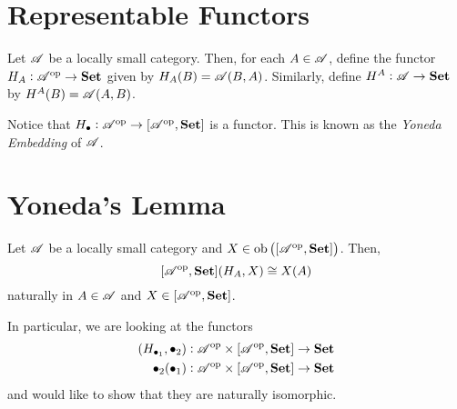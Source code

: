 \section{Representable Functors}

\begin{definition}
    Let $\mathscr{A}$ be a locally small category. Then, for each $A\in\mathscr{A}$, define the functor $H_A:\mathscr{A}^{\text{op}}\to\mathbf{Set}$ given by $H_{A}(B) = \mathscr{A}(B,A)$. Similarly, define $H^A:\mathscr{A}\to\mathbf{Set}$ by $H^A(B) = \mathscr{A}(A,B)$.
\end{definition}

Notice that $H_\bullet:\mathscr{A}^{\text{op}}\to[\mathscr{A}^{\text{op}},\mathbf{Set}]$ is a functor. This is known as the \textit{Yoneda Embedding} of $\mathscr{A}$.


\section{Yoneda's Lemma}

\begin{theorem}
    Let $\mathscr{A}$ be a locally small category and $X\in\operatorname{ob}\left([\mathscr{A}^{\text{op}},\mathbf{Set}]\right)$. Then, 
    $$[\mathscr{A}^{\text{op}},\mathbf{Set}](H_{A}, X) \cong X(A)$$
    naturally in $A\in\mathscr{A}$ and $X\in[\mathscr{A}^{\text{op}},\mathbf{Set}]$.
\end{theorem}
In particular, we are looking at the functors 
\begin{align*}
    [\A^\op,\catSet](H_{\bullet_1},\bullet_2): \A^\op\times[\A^\op,\catSet]\to\catSet\\
    \bullet_2(\bullet_1): \A^\op\times[\A^\op,\catSet]\to\catSet
\end{align*}
and would like to show that they are naturally isomorphic.

